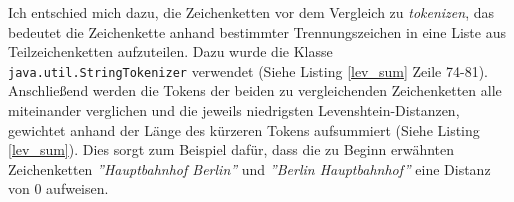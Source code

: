 Ich entschied mich dazu, die Zeichenketten vor dem Vergleich zu \textit{tokenizen}, das bedeutet die Zeichenkette anhand bestimmter Trennungszeichen in eine Liste aus Teilzeichenketten aufzuteilen. Dazu wurde die Klasse \texttt{java.util.StringTokenizer} verwendet (Siehe Listing \ref{lev_sum} Zeile 74-81). Anschließend werden die Tokens der beiden zu vergleichenden Zeichenketten alle miteinander verglichen und die jeweils niedrigsten Levenshtein-Distanzen, gewichtet anhand der Länge des kürzeren Tokens aufsummiert (Siehe Listing \ref{lev_sum}). Dies sorgt zum Beispiel dafür, dass die zu Beginn erwähnten Zeichenketten \textit{''Hauptbahnhof Berlin''} und \textit{''Berlin Hauptbahnhof''} eine Distanz von $0$ aufweisen.

